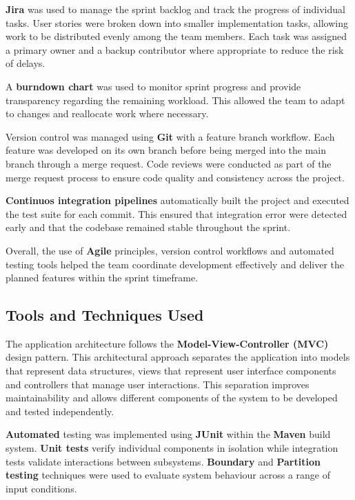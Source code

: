 \documentclass[a4paper,12pt]{article}
\begin{document}
\textbf{Jira} was used to manage the sprint backlog and track the progress of individual tasks. User stories were broken down into smaller implementation tasks, allowing work to be distributed evenly among the team members. Each task was assigned a primary owner and a backup contributor where appropriate to reduce the risk of delays.

A \textbf{burndown chart} was used to monitor sprint progress and provide transparency regarding the remaining workload. This allowed the team to adapt to changes and reallocate work where necessary.

Version control was managed using \textbf{Git} with a feature branch workflow. Each feature was developed on its own branch before being merged into the main branch through a merge request. Code reviews were conducted as part of the merge request process to ensure code quality and consistency across the project.

\textbf{Continuos integration pipelines} automatically built the project and executed the test suite for each commit. This ensured that integration error were detected early and that the codebase remained stable throughout the sprint.

Overall, the use of \textbf{Agile} principles, version control workflows and automated testing tools helped the team coordinate development effectively and deliver the planned features within the sprint timeframe.

\subsection{Tools and Techniques Used}

The application architecture follows the \textbf{Model-View-Controller (MVC)} design pattern. This architectural approach separates the application into models that represent data structures, views that represent user interface components and controllers that manage user interactions. This separation improves maintainability and allows different components of the system to be developed and tested independently.

\textbf{Automated} testing was implemented using \textbf{JUnit} within the \textbf{Maven} build system. \textbf{Unit tests} verify individual components in isolation while integration tests validate interactions between subsystems. \textbf{Boundary} and \textbf{Partition testing} techniques were used to evaluate system behaviour across a range of input conditions.
\end{document}
